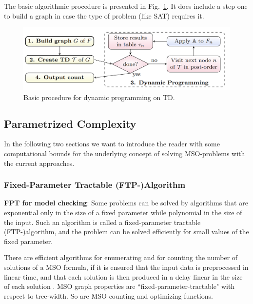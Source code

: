 \documentclass[a4paper, 12pt, bibliography=totoc]{scrartcl}
\begin{document}
The basic algorithmic procedure is presented in Fig.~\ref{fig:dpalgo}. It does include a step one to build a graph in case the type of problem (like SAT) requires it.
\begin{figure}[h]
	\centering
	\includegraphics{images/DPAlgo31.png}
	\caption{ Basic procedure for dynamic programming on TD. \cite[Figure~3.1]{DiplomarbeitZisser} }
	\label{fig:dpalgo}
\end{figure}


\subsection{Parametrized Complexity}
In the following two sections we want to introduce the reader with some computational bounds for the underlying concept of solving MSO-problems with the current approaches.

\subsubsection{Fixed-Parameter Tractable (FTP-)Algorithm}

\textbf{FPT for model checking}:
Some problems can be solved by algorithms that are exponential only in the size of a fixed parameter while polynomial in the size of the input. Such an algorithm is called a fixed-parameter tractable (FTP-)algorithm, and the problem can be solved efficiently for small values of the fixed parameter. \cite{ParamCompGrohe}

There are efficient algorithms for enumerating and for counting the number of solutions of a MSO formula, if it is ensured that the input data is preprocessed in linear time, and that each solution is then produced in a delay linear in the size of each solution \cite{MSOQueriesGuillaume, ARNBORG1991308}.
MSO graph properties are ``fixed-parameter-tractable" with respect to tree-width. So are MSO counting and optimizing functions. \cite{CourcelleGROW}
\end{document}
